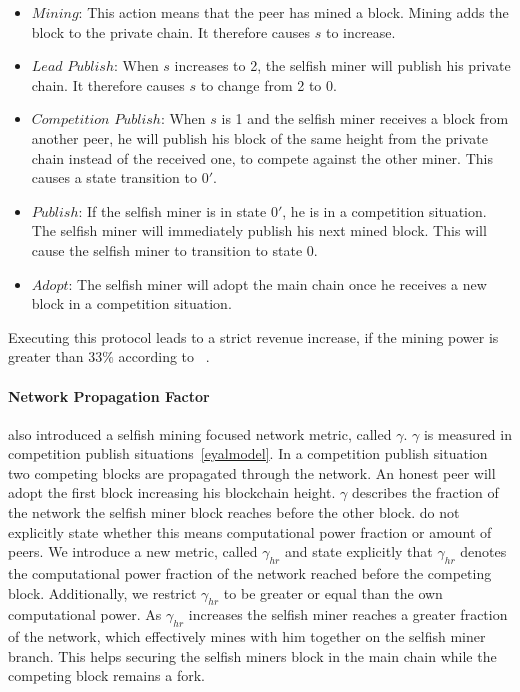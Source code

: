 \begin{itemize}
\item $Mining$: This action means that the peer has mined a block. Mining adds the block to the private chain. It therefore causes $s$ to increase.
\item $Lead$ $Publish$: When $s$ increases to 2, the selfish miner will publish his private chain. It therefore causes $s$ to change from 2 to 0.
\item $Competition$ $Publish$: When $s$ is 1 and the selfish miner receives a block from another peer, he will publish his block of the same height from the private chain instead of the received one, to compete against the other miner. This causes a state transition to $0'$.
\item $Publish$: If the selfish miner is in state $0'$, he is in a competition situation.
The selfish miner will immediately publish his next mined block. This will cause the selfish miner to transition to state $0$.
\item $Adopt$: The selfish miner will adopt the main chain once he receives a new block in a competition situation.
\end{itemize}
Executing this protocol leads to a strict revenue increase, if the mining power is greater than $33\%$ according to \citeauthor{eyal}~\cite{eyal}.
\paragraph{Network Propagation Factor}\label{netpropfac}
 also introduced a selfish mining focused network metric, called $\gamma$. $\gamma$ is measured in competition publish situations~\ref{eyalmodel}. In a competition publish situation two competing blocks are propagated through the network. An honest peer will adopt the first block increasing his blockchain height. $\gamma$ describes the fraction of the network the selfish miner block reaches before the other block.
 do not explicitly state whether this means computational power fraction or amount of peers. We introduce a new metric, called $\gamma_{hr}$ and state explicitly that $\gamma_{hr}$ denotes the computational power fraction of the network reached before the competing block. Additionally, we restrict $\gamma_{hr}$ to be greater or equal than the own computational power. As $\gamma_{hr}$ increases the selfish miner reaches a greater fraction of the network, which effectively mines with him together on the selfish miner branch. This helps securing the selfish miners block in the main chain while the competing block remains a fork.

